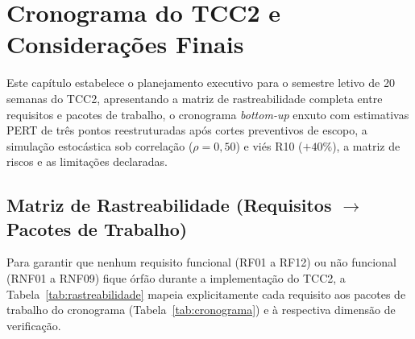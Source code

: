 \documentclass[12pt,openany,oneside,a4paper,english,brazilian,sumario=tradicional]{abntex2}
\begin{document}
\chapter{Cronograma do TCC2 e Considerações Finais}\label{cap:cronograma}

Este capítulo estabelece o planejamento executivo para o semestre letivo de 20 semanas do TCC2, apresentando a matriz de rastreabilidade completa entre requisitos e pacotes de trabalho, o cronograma \textit{bottom-up} enxuto com estimativas PERT de três pontos reestruturadas após cortes preventivos de escopo, a simulação estocástica sob correlação ($\rho=0{,}50$) e viés R10 ($+40\%$), a matriz de riscos e as limitações declaradas.

\section{Matriz de Rastreabilidade (Requisitos \texorpdfstring{$\rightarrow$}{->} Pacotes de Trabalho)}

Para garantir que nenhum requisito funcional (RF01 a RF12) ou não funcional (RNF01 a RNF09) fique órfão durante a implementação do TCC2, a Tabela~\ref{tab:rastreabilidade} mapeia explicitamente cada requisito aos pacotes de trabalho do cronograma (Tabela~\ref{tab:cronograma}) e à respectiva dimensão de verificação.
\end{document}
